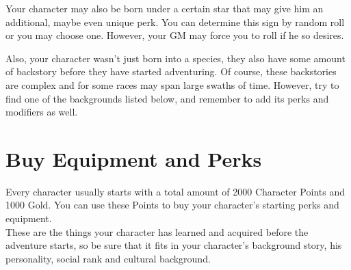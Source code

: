 Your character may also be born under a certain star that may give him an additional, maybe even unique perk. You can determine this sign by random roll or you may choose one. However, your GM may force you to roll if he so desires.

Also, your character wasn’t just born into a species, they also have some amount of backstory before they have started adventuring. Of course, these backstories are complex and for some races may span large swaths of time. However, try to find one of the backgrounds listed below, and remember to add its perks and modifiers as well.


\section{Buy Equipment and Perks}

Every character usually starts with a total amount of 2000 Character Points and 1000 Gold. You can use these Points to buy your character’s starting perks and equipment.\\
These are the things your character has learned and acquired before the adventure starts, so be sure that it fits in your character’s background story, his personality, social rank and cultural background.\\